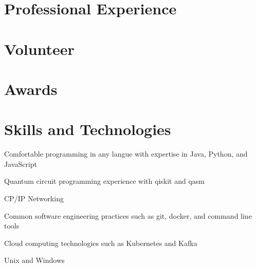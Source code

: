 \documentclass[11pt,a4paper,sans]{moderncv}        %
\begin{document}
\section{Professional Experience}

\section{Volunteer}

\section{Awards}

\section{Skills and Technologies}
Comfortable programming in any langue with expertise in Java, Python, and JavaScript

Quantum circuit programming experience with qiskit and qasm

CP/IP Networking

Common software engineering practices such as git, docker, and command line tools

Cloud computing technologies such as Kubernetes and Kafka 

Unix and Windows
\end{document}
